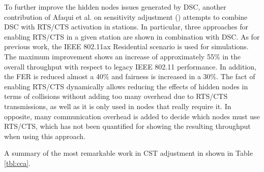 \documentclass[12pt, a4paper,twoside]{tesi_upf}
\begin{document}
			To further improve the hidden nodes issues generated by DSC, another contribution of Afaqui et al. on sensitivity adjustment (\cite{afaqui2016rtscts}) attempts to combine DSC with RTS/CTS activation in stations. In particular, three approaches for enabling RTS/CTS in a given station are shown in combination with DSC. As for previous work, the IEEE 802.11ax Residential scenario is used for simulations. The maximum improvement shows an increase of approximately 55\% in the overall throughput with respect to legacy IEEE 802.11 performance. In addition, the FER is reduced almost a 40\% and fairness is increased in a 30\%. The fact of enabling RTS/CTS dynamically allows reducing the effects of hidden nodes in terms of collisions without adding too many overhead due to RTS/CTS transmissions, as well as it is only used in nodes that really require it. In opposite, many communication overhead is added to decide which nodes must use RTS/CTS, which has not been quantified for showing the resulting throughput when using this approach.
			
			A summary of the most remarkable work in CST adjustment in shown in Table \ref{tbl:cca}.			
			\begin{table}[h!]
				\centering
				\caption{Carrier Sense Threshold Adjustment State-of-the-Art}
				\label{tbl:cca}
			\end{table}
		
\end{document}
